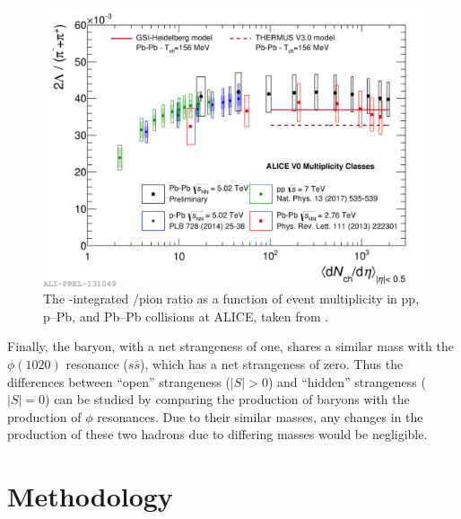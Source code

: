 \begin{figure}
\centering
\includegraphics[width=\textwidth]{figures/mnm/lambda_enhancement.png}
\caption{The \pt-integrated \lmb/pion ratio as a function of event multiplicity in pp, p--Pb, and Pb--Pb collisions at ALICE, taken from \cite{LambdaEnhancement}.}
\end{figure}

Finally, the \lmb baryon, with a net strangeness of one, shares a similar mass with the $\phi(1020)$ resonance ($s\bar{s}$), which has a net strangeness of zero. Thus the differences between ``open'' strangeness ($|S| > 0$) and ``hidden'' strangeness ($|S| = 0$) can be studied by comparing the production of \lmb baryons with the production of $\phi$ resonances. Due to their similar masses, any changes in the production of these two hadrons due to differing masses would be negligible.

\section{Methodology}

